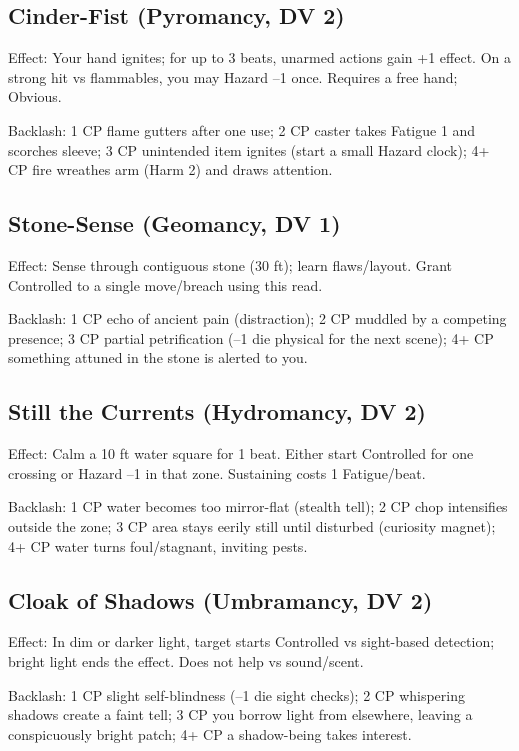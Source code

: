 \subsection{Cinder-Fist (Pyromancy, DV 2)}
Effect: Your hand ignites; for up to 3 beats, unarmed actions gain +1 effect. On a strong hit vs flammables, you may Hazard --1 once. Requires a free hand; Obvious.

Backlash: 1 CP flame gutters after one use; 2 CP caster takes Fatigue 1 and scorches sleeve; 3 CP unintended item ignites (start a small Hazard clock); 4+ CP fire wreathes arm (Harm 2) and draws attention.

\subsection{Stone-Sense (Geomancy, DV 1)}
Effect: Sense through contiguous stone (30 ft); learn flaws/layout. Grant Controlled to a single move/breach using this read.

Backlash: 1 CP echo of ancient pain (distraction); 2 CP muddled by a competing presence; 3 CP partial petrification (--1 die physical for the next scene); 4+ CP something attuned in the stone is alerted to you.

\subsection{Still the Currents (Hydromancy, DV 2)}
Effect: Calm a 10 ft water square for 1 beat. Either start Controlled for one crossing or Hazard --1 in that zone. Sustaining costs 1 Fatigue/beat.

Backlash: 1 CP water becomes too mirror-flat (stealth tell); 2 CP chop intensifies outside the zone; 3 CP area stays eerily still until disturbed (curiosity magnet); 4+ CP water turns foul/stagnant, inviting pests.

\subsection{Cloak of Shadows (Umbramancy, DV 2)}
Effect: In dim or darker light, target starts Controlled vs sight-based detection; bright light ends the effect. Does not help vs sound/scent.

Backlash: 1 CP slight self-blindness (--1 die sight checks); 2 CP whispering shadows create a faint tell; 3 CP you borrow light from elsewhere, leaving a conspicuously bright patch; 4+ CP a shadow-being takes interest.

